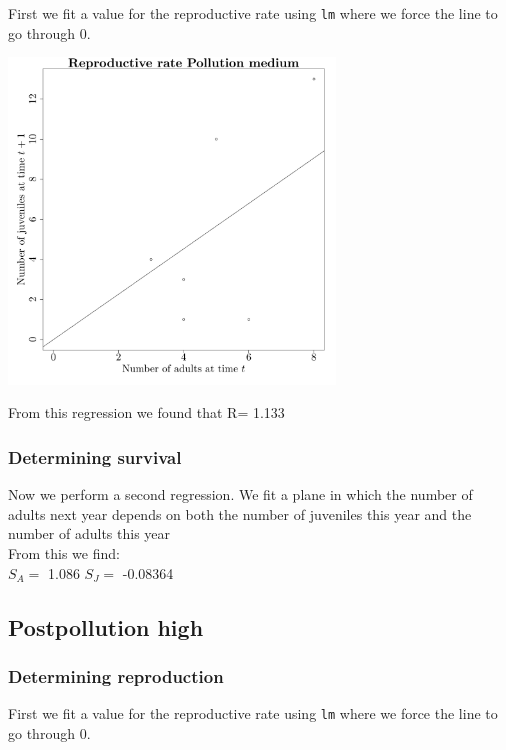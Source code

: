 \documentclass{article}\usepackage[]{graphicx}\usepackage[]{color}
\begin{document}
First we fit a value for the reproductive rate using \texttt{lm} where we force the line to go through $0$. 



{\centering \includegraphics[width=0.65\textwidth]{figure/k56} 

}



 From this regression we found that R= 1.133 

\subsubsection{Determining survival}

Now we perform a second regression. We fit a plane in which the number of adults next year depends on both the number of juveniles this year and the number of adults this year\\From this we find:\\ 
$S_A=$ 1.086 
$S_J=$ -0.08364 
\subsection{ Postpollution high }
\subsubsection{Determining reproduction}

First we fit a value for the reproductive rate using \texttt{lm} where we force the line to go through $0$. 
\end{document}
